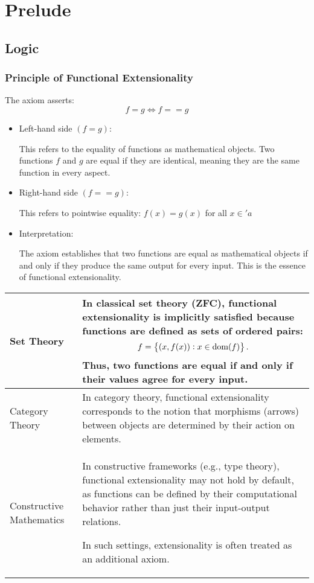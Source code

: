 \section{Prelude}
\subsection{Logic}
\subsubsection*{Principle of Functional Extensionality}
The axiom asserts: \[
f=g\iff f==g
\]
\begin{itemize}
	\item Left-hand side $(f=g)$:
	
	This refers to the equality of functions as mathematical objects. Two functions 
	$f$ and $g$ are equal if they are identical, meaning they are the same function in every aspect.
	\item Right-hand side $(f==g)$:
	
	This refers to pointwise equality: 
	$f(x)=g(x)$ for all $x\in'a$
	\item Interpretation:
	
	The axiom establishes that two functions are equal as mathematical objects if and only if they produce the same output for every input. This is the essence of functional extensionality.
\end{itemize}

\begin{table}[h!]
\begin{tabularx}{\textwidth}{>{\raggedleft\arraybackslash}p{}|p{}}
\toprule[1.2pt]
Set Theory & In classical set theory (ZFC), functional extensionality is implicitly satisfied because functions are defined as sets of ordered pairs: \[
f=\set{(x,f(x)):x\in\text{dom}(f)}.
\] Thus, two functions are equal if and only if their values agree for every input. \\ \hline
Category Theory & In category theory, functional extensionality corresponds to the notion that morphisms (arrows) between objects are determined by their action on elements. \\ \hline
Constructive Mathematics & In constructive frameworks (e.g., type theory), functional extensionality may not hold by default, as functions can be defined by their computational behavior rather than just their input-output relations.\par
In such settings, extensionality is often treated as an additional axiom. \\
\bottomrule[1.2pt]
\end{tabularx}
\end{table}

